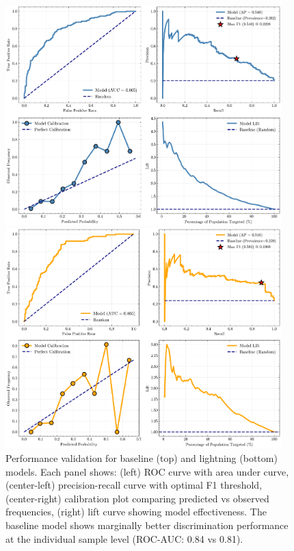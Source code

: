 \documentclass[11pt,a4paper]{article}
\begin{document}
\begin{figure}[H]
\centering
\includegraphics[width=0.95\textwidth]{../output/figures/validation_performance_baseline.png}

\vspace{0.5cm}

\includegraphics[width=0.95\textwidth]{../output/figures/validation_performance_lightning.png}
\caption{Performance validation for baseline (top) and lightning (bottom) models. Each panel shows: (left) ROC curve with area under curve, (center-left) precision-recall curve with optimal F1 threshold, (center-right) calibration plot comparing predicted vs observed frequencies, (right) lift curve showing model effectiveness. The baseline model shows marginally better discrimination performance at the individual sample level (ROC-AUC: 0.84 vs 0.81).}
\label{fig:performance_validation}
\end{figure}
\end{document}
